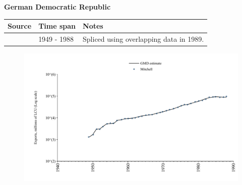 \documentclass[12pt,a4paper,landscape]{article}
\begin{document}
\begin{adjustbox}{max totalsize={\paperwidth}{\paperheight},center}
\begin{minipage}[t][\textheight][t]{\textwidth}
\vspace*{0.5cm}
{}
\begin{center}
{\Large\bfseries German Democratic Republic}
\end{center}
\vspace{0.5cm}
\begin{table}[H]
\centering
\small
\begin{tabular}{|l|l|l|}
\hline
\textbf{Source} & \textbf{Time span} & \textbf{Notes} \\
\hline
\rowcolor{white}\cite{Mitchell}& 1949 - 1988 &Spliced using overlapping data in 1989.\\
\hline
\end{tabular}
\end{table}
\begin{figure}[H]
\centering
\includegraphics[width=\textwidth,height=0.6\textheight,keepaspectratio]{graphs/DDR_exports.pdf}
\end{figure}
\end{minipage}
\end{adjustbox}
\end{document}
